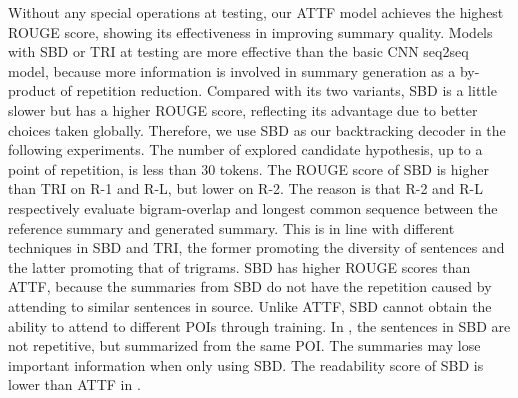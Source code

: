 Without any special operations at testing, 
our ATTF model achieves the highest ROUGE score, showing
its effectiveness in improving summary quality.
Models with SBD or TRI at testing
are more effective than the basic CNN seq2seq model,
because more information is involved in summary generation 
as a by-product of repetition reduction.
Compared with its two variants, SBD is a little slower 
but has a higher ROUGE score, reflecting its advantage due to
better choices taken globally.
Therefore, 
we use SBD as our backtracking decoder in the following experiments. 
The number of explored candidate hypothesis, up to a point of
repetition, is less than 30 tokens.
The ROUGE score of SBD is higher than TRI on R-1 and R-L, but lower on R-2. 
The reason is that R-2 and R-L respectively evaluate
bigram-overlap and longest common sequence between the reference
summary and generated summary. This is in line with different techniques 
in SBD and TRI, the former promoting the diversity of sentences and 
the latter promoting that of trigrams.
SBD has higher ROUGE scores than ATTF, 
because the summaries from
SBD do not have the repetition caused by attending to similar sentences in source.
Unlike ATTF, 
SBD cannot obtain the ability to attend to different POIs through training.
In , the sentences in SBD are not repetitive, 
but summarized from the same POI.
The summaries may lose important information when only using SBD.
The readability score of SBD is lower than ATTF in .

